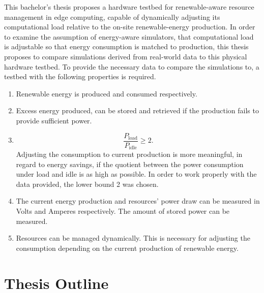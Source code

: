 This bachelor's thesis proposes a hardware testbed for renewable-aware resource
management in edge computing, capable of dynamically adjusting its computational
load relative to the on-site renewable-energy production. In order to examine
the assumption of energy-aware simulators, that computational load is adjustable
so that energy consumption is matched to production, this thesis proposes to
compare simulations derived from real-world data to this physical hardware
testbed. To provide the necessary data to compare the simulations to, a testbed
with the following properties is required.

\begin{enumerate}
    \item Renewable energy is produced and consumed respectively.
    \item Excess energy produced, can be stored and retrieved if the production
        fails to provide sufficient power.
    \item \[ \frac{P_{\text{load}}}{P_{\text{idle}}} \geq 2 .\]
        Adjusting the consumption to current production is more meaningful, in
        regard to energy savings, if the quotient between the power consumption
        under load and idle is as high as possible. In order to work properly
        with the data provided, the lower bound 2 was chosen.
    \item The current energy production and resources' power draw can be
        measured in Volts and Amperes respectively. The amount of stored power
        can be measured.
    \item Resources can be managed dynamically. This is necessary for adjusting
        the consumption depending on the current production of renewable energy.
\end{enumerate}

\section{Thesis Outline}
